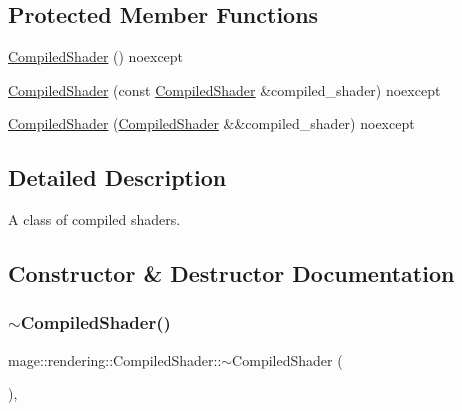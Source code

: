\subsection*{Protected Member Functions}
\begin{DoxyCompactItemize}
\item 
\hyperlink{classmage_1_1rendering_1_1_compiled_shader_a4e62e8d016992f4d7d51297d3796d05d}{Compiled\+Shader} () noexcept
\item 
\hyperlink{classmage_1_1rendering_1_1_compiled_shader_a13ebfdc6d2d9ba554160829a83244e8b}{Compiled\+Shader} (const \hyperlink{classmage_1_1rendering_1_1_compiled_shader}{Compiled\+Shader} \&compiled\+\_\+shader) noexcept
\item 
\hyperlink{classmage_1_1rendering_1_1_compiled_shader_a20a7e1e0b2e9bf378aeda9bf8e429c43}{Compiled\+Shader} (\hyperlink{classmage_1_1rendering_1_1_compiled_shader}{Compiled\+Shader} \&\&compiled\+\_\+shader) noexcept
\end{DoxyCompactItemize}


\subsection{Detailed Description}
A class of compiled shaders. 

\subsection{Constructor \& Destructor Documentation}
\hypertarget{classmage_1_1rendering_1_1_compiled_shader_abb17672237a99552beef603cd1d4f680}{}\label{classmage_1_1rendering_1_1_compiled_shader_abb17672237a99552beef603cd1d4f680} 
\subsubsection{\texorpdfstring{$\sim$\+Compiled\+Shader()}{~CompiledShader()}}
{\footnotesize\ttfamily mage\+::rendering\+::\+Compiled\+Shader\+::$\sim$\+Compiled\+Shader (\begin{DoxyParamCaption}{ }\end{DoxyParamCaption})\hspace{0.3cm}{\ttfamily [virtual]}, {\ttfamily [default]}}

